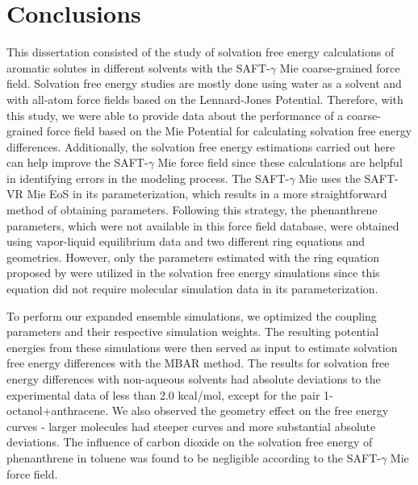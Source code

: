 \chapter{Conclusions} %

\label{Chapter6} 

This dissertation consisted of the study of solvation free energy calculations of aromatic solutes in different solvents with the SAFT-$\gamma$ Mie coarse-grained force field. Solvation free energy studies are mostly done using water as a solvent and with all-atom force fields based on the Lennard-Jones Potential. Therefore, with this study, we were able to provide data about the performance of a coarse-grained force field based on the Mie Potential for calculating solvation free energy differences. Additionally, the solvation free energy estimations carried out here can help improve the SAFT-$\gamma$  Mie force field since these calculations are helpful in identifying errors in the modeling process. The SAFT-$\gamma$ Mie uses the SAFT-VR Mie EoS in its parameterization, which results in a more straightforward method of obtaining parameters. Following this strategy, the phenanthrene parameters, which were not available in this force field database, were obtained using vapor-liquid equilibrium data and two different ring equations and geometries. However, only the parameters estimated with the ring equation proposed by  were utilized in the solvation free energy simulations since this equation did not require molecular simulation data in its parameterization.

To perform our expanded ensemble simulations, we optimized the coupling parameters and their respective simulation weights. The resulting potential energies from these simulations were then served as input to estimate solvation free energy differences with the MBAR method. The results for solvation free energy differences with non-aqueous solvents had absolute deviations to the experimental
data of less than 2.0 kcal/mol, except for the pair 1-octanol+anthracene. We also observed the geometry effect on the free energy curves - larger molecules had steeper curves and more substantial absolute deviations. The influence of carbon dioxide on the solvation free energy of phenanthrene in toluene was found to be negligible according to the SAFT-$\gamma$ Mie force field. 

